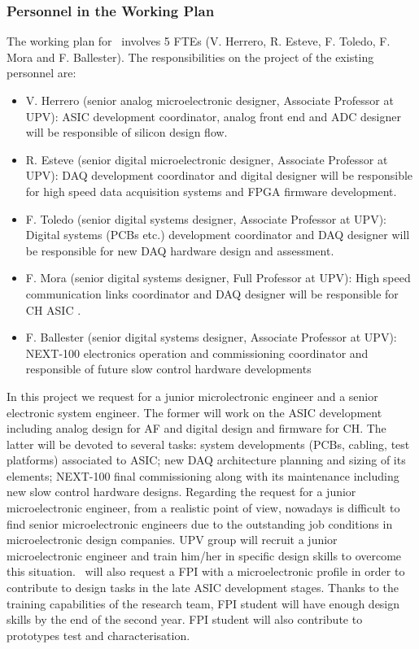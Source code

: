 \subsubsection*{Personnel in the Working Plan}
The working plan for \sUPV\ involves 5 FTEs (V. Herrero, R. Esteve, F. Toledo, F. Mora and F. Ballester). The responsibilities on the project of the existing personnel are:
\begin{itemize}[noitemsep,topsep=0pt,parsep=0pt,partopsep=0pt]
\item V. Herrero (senior analog microelectronic designer, Associate Professor at UPV): ASIC development coordinator, analog front end and ADC designer will be responsible of silicon design flow.
\item R. Esteve (senior digital microelectronic designer, Associate Professor at UPV): DAQ development coordinator and digital designer will be responsible for high speed data acquisition systems and FPGA firmware development.
\item F. Toledo (senior digital systems designer, Associate Professor at UPV): Digital systems (PCBs etc.) development coordinator and DAQ designer will be responsible for new DAQ hardware design and assessment.
\item F. Mora (senior digital systems designer, Full Professor at UPV): High speed communication links coordinator and DAQ designer will be responsible for CH ASIC .
\item F. Ballester (senior digital systems designer, Associate Professor at UPV): NEXT-100 electronics operation and commissioning coordinator and responsible of future slow control hardware developments
\end{itemize}

In this project we request for a junior microlectronic engineer and a senior electronic system engineer. The former will work on the ASIC development including analog design for AF and digital design and firmware for CH. The latter will be devoted to several tasks: system developments (PCBs, cabling, test platforms) associated to ASIC; new DAQ architecture planning and sizing of its elements; NEXT-100 final commissioning along with its maintenance including new slow control hardware designs. Regarding the request for a junior microelectronic engineer, from a realistic point of view, nowadays is difficult to find senior microelectronic engineers due to the outstanding job conditions in microelectronic design companies. UPV group will recruit a junior microelectronic engineer and train him/her in specific design skills to overcome this situation. 
\sUPV\ will also request a FPI with a microelectronic profile in order to contribute to design tasks in the late ASIC development stages. Thanks to the training capabilities of the research team, FPI student will have enough design skills by the end of the second year. FPI student will also contribute to prototypes test and characterisation.

